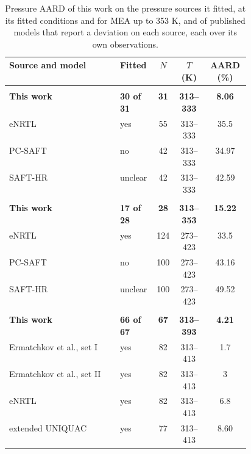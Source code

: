 \begin{table}[pos=!htbp]\small\setlength{\tabcolsep}{2pt}\caption{Pressure AARD of this work on the pressure sources it fitted, at its fitted conditions and for MEA up to 353 K, and of published models that report a deviation on each source, each over its own observations.}\label{tab:published-models}
\begin{tabular}{@{}>{\raggedright\arraybackslash}p{0.46\linewidth}lccS[table-format=2.2,detect-weight]@{}}
\toprule Source and model & Fitted & $N$ & $T$ (K) & {AARD (\%)} \\ \midrule
\addlinespace{} \\*
\bfseries \quad This work & \bfseries 30 of 31 & \bfseries 31 & \bfseries 313--333 & \bfseries 8.06 \\
\quad eNRTL \cite{Zhang2011} & yes & 55 & 313--333 & 35.5 \\
\quad PC-SAFT \cite{Baygi2015} & no & 42 & 313--333 & 34.97 \\
\quad SAFT-HR \cite{Najafloo2018} & unclear & 42 & 313--333 & 42.59 \\
\addlinespace{} \\*
\bfseries \quad This work & \bfseries 17 of 28 & \bfseries 28 & \bfseries 313--353 & \bfseries 15.22 \\
\quad eNRTL \cite{Zhang2011} & yes & 124 & 273--423 & 33.5 \\
\quad PC-SAFT \cite{Baygi2015} & no & 100 & 273--423 & 43.16 \\
\quad SAFT-HR \cite{Najafloo2018} & unclear & 100 & 273--423 & 49.52 \\
\addlinespace{} \\*
\bfseries \quad This work & \bfseries 66 of 67 & \bfseries 67 & \bfseries 313--393 & \bfseries 4.21 \\
\quad Ermatchkov et al., set I \cite{ermatchkovSolubilityCarbonDioxide2006} & yes & 82 & 313--413 & 1.7 \\
\quad Ermatchkov et al., set II \cite{ermatchkovSolubilityCarbonDioxide2006} & yes & 82 & 313--413 & 3 \\
\quad eNRTL \cite{zhangThermodynamicModelingCO22011} & yes & 82 & 313--413 & 6.8 \\
\quad extended UNIQUAC \cite{sadeghThermodynamicModelingCO22015} & yes & 77 & 313--413 & 8.60 \\

\end{tabular}
\end{table}
